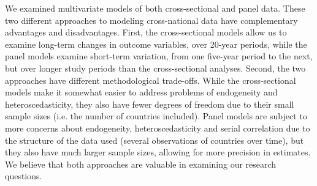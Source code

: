 \documentclass[12pt]{article}
\begin{document}
We examined multivariate models of both cross-sectional and panel data. These two different approaches to modeling cross-national data have complementary advantages and disadvantages.
First, the cross-sectional models allow us to examine long-term changes in outcome variables, over 20-year periods, while the panel models examine short-term variation, from one five-year period to the next, but over longer study periods than the cross-sectional analyses.
Second, the two approaches have different methodological trade-offs. While the cross-sectional models make it somewhat easier to address problems of endogeneity and heteroscedasticity, they also have fewer degrees of freedom due to their small sample sizes (i.e. the number of countries included). Panel models are subject to more concerns about endogeneity, heteroscedasticity and serial correlation due to the structure of the data used (several observations of countries over time), but they also have much larger sample sizes, allowing for more precision in estimates. We believe that both approaches are valuable in examining our research questions.
\end{document}
